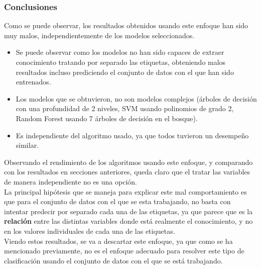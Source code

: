 \subsubsection*{Conclusiones}
Como se puede observar, los resultados obtenidos usando este enfoque han sido muy malos, independientemente de los modelos seleccionados.
\begin{itemize}
	\item Se puede observar como los modelos no han sido capaces de extraer conocimiento tratando por separado las etiquetas, obteniendo malos resultados incluso prediciendo el conjunto de datos con el que han sido entrenados.
	\item Los modelos que se obtuvieron, no son modelos complejos (árboles de decisión con una profundidad de 2 niveles, SVM usando polinomios de grado 2, Random Forest usando 7 árboles de decisión en el bosque).
	\item Es independiente del algoritmo usado, ya que todos tuvieron un desempeño similar.
\end{itemize}
Observando el rendimiento de los algoritmos usando este enfoque, y comparando con los resultados en secciones anteriores, queda claro que el tratar las variables de manera independiente no es una opción.\\
\linebreak
La principal hipótesis que se maneja para explicar este mal comportamiento es que para el conjunto de datos con el que se esta trabajando, no basta con intentar predecir por separado cada una de las etiquetas, ya que parece que es la \textbf{relación} entre las distintas variables donde está realmente el conocimiento, y no en los valores individuales de cada una de las etiquetas.\\
\linebreak
Viendo estos resultados, se va a descartar este enfoque, ya que como se ha mencionado previamente, no es el enfoque adecuado para resolver este tipo de clasificación usando el conjunto de datos con el que se está trabajando.

